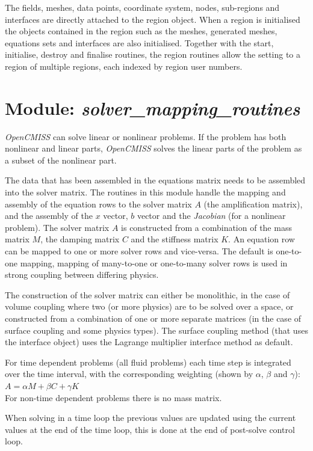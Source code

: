 The fields, meshes, data points, coordinate system, nodes, sub-regions and 
interfaces are directly attached to the region object. When a region is 
initialised the objects contained in the region such as the meshes, generated 
meshes, equations sets and interfaces are also initialised. Together with the 
start, initialise, destroy and finalise routines, the region routines allow 
the setting to a region of multiple regions, each indexed by region user 
numbers.


\section{Module: \emph{solver\_mapping\_routines}}
\label{sec:solvermappingroutines}

\emph{OpenCMISS} can solve linear or nonlinear problems. If the problem has 
both nonlinear and linear parts, \emph{OpenCMISS} solves the linear parts 
of the problem as a subset of the nonlinear part.

The data that has been assembled in the equations matrix needs to be assembled 
into the solver matrix. The routines in this module handle the mapping and 
assembly of the equation rows to the solver matrix $A$ (the amplification 
matrix), and the assembly of the $x$ vector, $b$ vector and the \emph{Jacobian} 
(for a nonlinear problem). The solver matrix $A$ is constructed from a 
combination of the mass matrix $M$, the damping matrix $C$ and the stiffness 
matrix $K$. An equation row can be mapped to one or more solver rows and 
vice-versa. The default is one-to-one mapping, mapping of many-to-one or 
one-to-many solver rows is used in strong coupling between differing physics.

The construction of the solver matrix can either be monolithic, in the case of
volume coupling where two (or more physics) are to be solved over a space, or
constructed from a combination of one or more separate matrices (in the case of
surface coupling and some physics types). The surface coupling method (that
uses the interface object) uses the Lagrange multiplier interface method as 
default.

For time dependent problems (all fluid problems) each time step is integrated 
over the time interval, with the corresponding weighting (shown by $\alpha$, 
$\beta$ and $\gamma$): $A=\alpha M + \beta C+ \gamma K$ \\
For non-time dependent problems there is no mass matrix.

When solving in a time loop the previous values are updated using the current
values at the end of the time loop, this is done at the end of post-solve
control loop.


